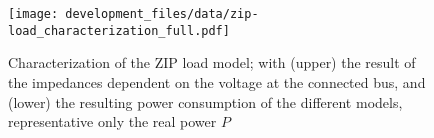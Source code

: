 
\begin{figure}[htb!]
        \centering
        \texttt{[image: development\_files/data/zip-load\_characterization\_full.pdf]}
        \caption[Characterization of the ZIP load model]{Characterization of the ZIP load model; with (upper) the result of the impedances dependent on the voltage at the connected bus, and (lower) the resulting power consumption of the different models, representative only the real power $P$}
        \label{fig:zip-charac}
\end{figure}




